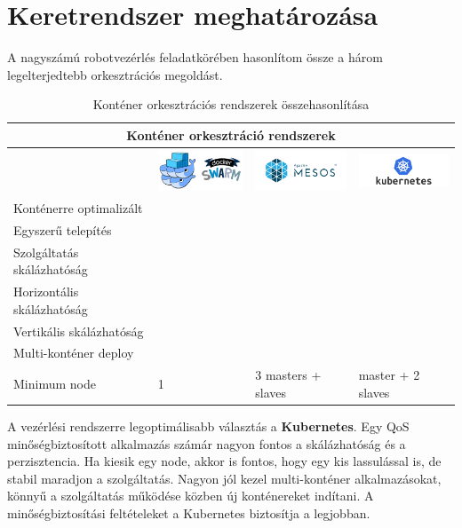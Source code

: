 \section{Keretrendszer meghatározása}
A nagyszámú robotvezérlés feladatkörében hasonlítom össze a három legelterjedtebb orkesztrációs megoldást.
\begin{center}
	\begin{table}
	\begin{tabular}{ |p{5cm}|p{3cm}|p{3cm}|p{3cm}|  }
		\hline
		\multicolumn{4}{|c|}{Konténer orkesztráció rendszerek} \\
		\hline
		&
		\begin{minipage}{.3\textwidth}
			\includegraphics[width=3cm]{figures/docker_swarm.png}
		\end{minipage} 
		&
		\begin{minipage}{.3\textwidth}
			\includegraphics[width=3cm]{figures/mesos.png}
		\end{minipage} 
		&
		\begin{minipage}{.3\textwidth}
			\includegraphics[width=3cm]{figures/kubernetes.png}
		\end{minipage} 
		 \\
		\hline
		Konténerre optimalizált & \cmark & \xmark & \cmark \\
		Egyszerű telepítés & \cmark & \xmark & \xmark \\
		Szolgáltatás skálázhatóság & \xmark & \xmark & \cmark  \\
		Horizontális skálázhatóság & \cmark & \cmark & \cmark \\
		Vertikális skálázhatóság & \xmark & \cmark & \cmark \\
		Multi-konténer deploy & \cmark & \xmark & \cmark \\
		Minimum node & 1 & 3 masters + slaves & master + 2 slaves \\
		\hline
	\end{tabular}
	\caption{Konténer orkesztrációs rendszerek összehasonlítása}
	\end{table}
\end{center}
A vezérlési rendszerre legoptimálisabb választás a \textbf{Kubernetes}.
Egy QoS minőségbiztosított alkalmazás számár nagyon fontos a skálázhatóság és a perzisztencia. Ha kiesik egy node, akkor is fontos, hogy egy kis lassulással is, de stabil maradjon a szolgáltatás. Nagyon jól kezel multi-konténer alkalmazásokat, könnyű a szolgáltatás működése közben új konténereket indítani. A minőségbiztosítási feltételeket a Kubernetes biztosítja a legjobban.
